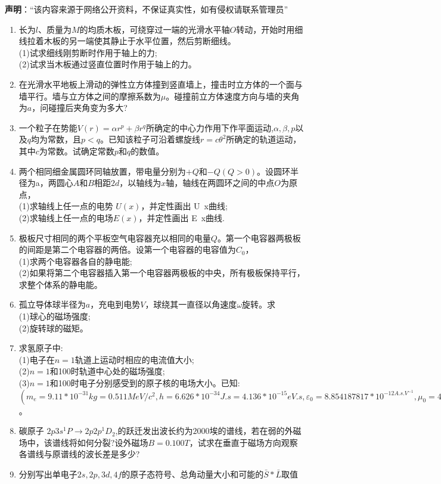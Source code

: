 
\textbf{声明}：“该内容来源于网络公开资料，不保证真实性，如有侵权请联系管理员”
\begin{enumerate}
\item 长为$l$、质量为$M$的均质木板，可绕穿过一端的光滑水平轴$O$转动，开始时用细线拉着木板的另一端使其静止于水平位置，然后剪断细线。\\
(1)试求细线刚剪断时作用于轴上的力;\\
(2)试求当木板通过竖直位置时作用于轴上的力。
\item 在光滑水平地板上滑动的弹性立方体撞到竖直墙上，撞击时立方体的一个面与墙平行。墙与立方体之间的摩擦系数为$\mu$。碰撞前立方体速度方向与墙的夹角为$a$，问碰撞后夹角变为多大?
\item 一个粒子在势能$V(r)=\alpha r^p+\beta r^q$所确定的中心力作用下作平面运动,$\alpha,\beta,p$以及$q$均为常数，且$p<q$。已知该粒子可沿着螺旋线$r=c\theta^2$所确定的轨道运动，其中$c$为常数。试确定常数$p$和$q$的数值。
\item 两个相同细金属圆环同轴放置，带电量分别为$+Q$和$-Q(Q>0)$。设圆环半径为a，两圆心$A$和$B$相距$2d$，以轴线为$x$轴，轴线在两圆环之间的中点$O$为原点，\\
(1)求轴线上任一点的电势 $U(x)$，并定性画出 U~x曲线;\\
(2)求轴线上任一点的电场$E(x)$，并定性画出 E~x曲线.
\item 极板尺寸相同的两个平板空气电容器充以相同的电量$Q$。第一个电容器两极板的间距是第二个电容器的两倍。设第一个电容器的电容值为$C_0$，\\
(1)求两个电容器各自的静电能;\\
(2)如果将第二个电容器插入第一个电容器两极板的中央，所有极板保持平行，求整个体系的静电能。
\item 孤立导体球半径为$a$，充电到电势$V$，球绕其一直径以角速度$\omega$旋转。求\\
(1)球心的磁场强度;\\
(2)旋转球的磁矩。
\item 求氢原子中:\\
(1)电子在$n=1$轨道上运动时相应的电流值大小;\\
(2)$n=1$和100时轨道中心处的磁场强度;\\
(3)$n=1$和100时电子分别感受到的原子核的电场大小。已知:$(m_e=9.11*10^{-31}kg=0.511MeV/c^2,h=6.626*10^{-34}J.s=4.136*10^{-15}eV.s,\varepsilon_0=8.854187817*10^{-12 A.s.V^{-1}},\mu_0=4\pi*10^{-7}=12.566370614*10^{-7}N.A^{-2})$。
\item 碳原子 $2p3s ^1P\to 2p2p ^1D_2$,的跃迁发出波长约为$2000$埃的谱线，若在弱的外磁场中，该谱线将如何分裂?设外磁场$B=0.100T$，试求在垂直于磁场方向观察各谱线与原谱线的波长差是多少?
\item 分别写出单电子$2s,2p,3d,4f$的原子态符号、总角动量大小和可能的$\bar S*\bar L$取值
\end{enumerate}